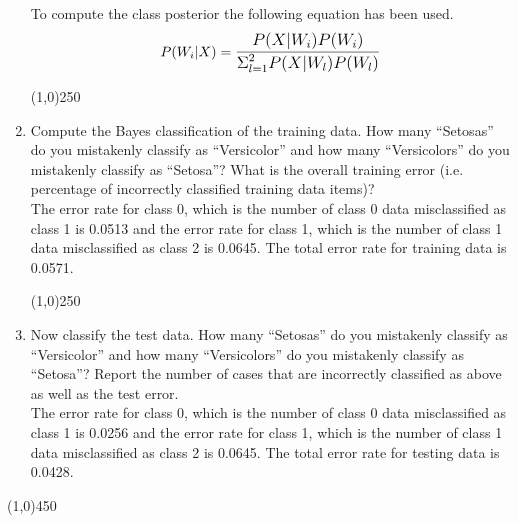 \documentclass[12pt]{article}
\begin{document}
\begin{enumerate}
To compute the class posterior the following equation has been used.
\begin{equation}
P(W_i|X) = \mathlarger{\frac{P(X|W_i)P(W_i)}{\mathlarger{\Sigma}_{l=1}^2 P(X|W_l)P(W_l)}}
\end{equation}

\begin{center}
\line(1,0){250}
\end{center}

\item Compute the Bayes classification of the training data. How many “Setosas” do you mistakenly classify as “Versicolor” and how many “Versicolors” do you mistakenly classify as “Setosa”? What is the overall training error (i.e. percentage of incorrectly classified training data items)?\\

The error rate for class 0, which is the number of class 0 data misclassified as class 1 is 0.0513 and the error rate for class 1, which is the number of class 1 data misclassified as class 2 is 0.0645. The total error rate for training data is 0.0571.

\begin{center}
\line(1,0){250}
\end{center}

\item Now classify the test data. How many “Setosas” do you mistakenly classify as “Versicolor” and how many “Versicolors” do you mistakenly classify as “Setosa”? Report the number of cases that are incorrectly classified as above as well as the test error.\\


The error rate for class 0, which is the number of class 0 data misclassified as class 1 is 0.0256 and the error rate for class 1, which is the number of class 1 data misclassified as class 2 is 0.0645. The total error rate for testing data is 0.0428.


\end{enumerate}

\begin{center}
\line(1,0){450}
\end{center}
































\end{document}
